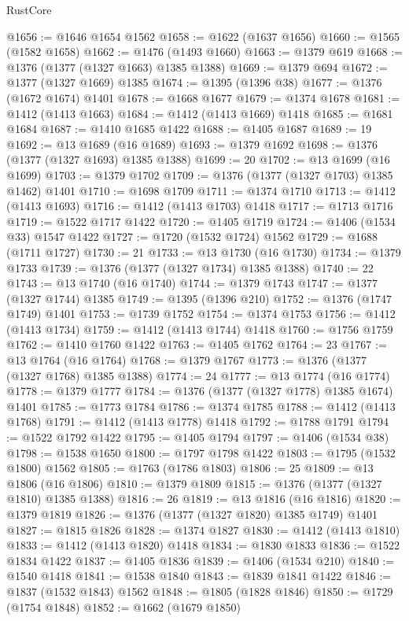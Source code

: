 \begin{lexlean}{RustCore}
\begin{coremodule}
@1656 := @1646 @1654 @1562
@1658 := @1622 (@1637 @1656)
@1660 := @1565 (@1582 @1658)
@1662 := @1476 (@1493 @1660)
@1663 := @1379 @619
@1668 := @1376 (@1377 (@1327 @1663) @1385 @1388)
@1669 := @1379 @694
@1672 := @1377 (@1327 @1669) @1385
@1674 := @1395 (@1396 @38)
@1677 := @1376 (@1672 @1674) @1401
@1678 := @1668 @1677
@1679 := @1374 @1678
@1681 := @1412 (@1413 @1663)
@1684 := @1412 (@1413 @1669) @1418
@1685 := @1681 @1684
@1687 := @1410 @1685 @1422
@1688 := @1405 @1687
@1689 := 19
@1692 := @13 @1689 (@16 @1689)
@1693 := @1379 @1692
@1698 := @1376 (@1377 (@1327 @1693) @1385 @1388)
@1699 := 20
@1702 := @13 @1699 (@16 @1699)
@1703 := @1379 @1702
@1709 := @1376 (@1377 (@1327 @1703) @1385 @1462) @1401
@1710 := @1698 @1709
@1711 := @1374 @1710
@1713 := @1412 (@1413 @1693)
@1716 := @1412 (@1413 @1703) @1418
@1717 := @1713 @1716
@1719 := @1522 @1717 @1422
@1720 := @1405 @1719
@1724 := @1406 (@1534 @33) @1547 @1422
@1727 := @1720 (@1532 @1724) @1562
@1729 := @1688 (@1711 @1727)
@1730 := 21
@1733 := @13 @1730 (@16 @1730)
@1734 := @1379 @1733
@1739 := @1376 (@1377 (@1327 @1734) @1385 @1388)
@1740 := 22
@1743 := @13 @1740 (@16 @1740)
@1744 := @1379 @1743
@1747 := @1377 (@1327 @1744) @1385
@1749 := @1395 (@1396 @210)
@1752 := @1376 (@1747 @1749) @1401
@1753 := @1739 @1752
@1754 := @1374 @1753
@1756 := @1412 (@1413 @1734)
@1759 := @1412 (@1413 @1744) @1418
@1760 := @1756 @1759
@1762 := @1410 @1760 @1422
@1763 := @1405 @1762
@1764 := 23
@1767 := @13 @1764 (@16 @1764)
@1768 := @1379 @1767
@1773 := @1376 (@1377 (@1327 @1768) @1385 @1388)
@1774 := 24
@1777 := @13 @1774 (@16 @1774)
@1778 := @1379 @1777
@1784 := @1376 (@1377 (@1327 @1778) @1385 @1674) @1401
@1785 := @1773 @1784
@1786 := @1374 @1785
@1788 := @1412 (@1413 @1768)
@1791 := @1412 (@1413 @1778) @1418
@1792 := @1788 @1791
@1794 := @1522 @1792 @1422
@1795 := @1405 @1794
@1797 := @1406 (@1534 @38)
@1798 := @1538 @1650
@1800 := @1797 @1798 @1422
@1803 := @1795 (@1532 @1800) @1562
@1805 := @1763 (@1786 @1803)
@1806 := 25
@1809 := @13 @1806 (@16 @1806)
@1810 := @1379 @1809
@1815 := @1376 (@1377 (@1327 @1810) @1385 @1388)
@1816 := 26
@1819 := @13 @1816 (@16 @1816)
@1820 := @1379 @1819
@1826 := @1376 (@1377 (@1327 @1820) @1385 @1749) @1401
@1827 := @1815 @1826
@1828 := @1374 @1827
@1830 := @1412 (@1413 @1810)
@1833 := @1412 (@1413 @1820) @1418
@1834 := @1830 @1833
@1836 := @1522 @1834 @1422
@1837 := @1405 @1836
@1839 := @1406 (@1534 @210)
@1840 := @1540 @1418
@1841 := @1538 @1840
@1843 := @1839 @1841 @1422
@1846 := @1837 (@1532 @1843) @1562
@1848 := @1805 (@1828 @1846)
@1850 := @1729 (@1754 @1848)
@1852 := @1662 (@1679 @1850)

\end{coremodule}
\end{lexlean}
